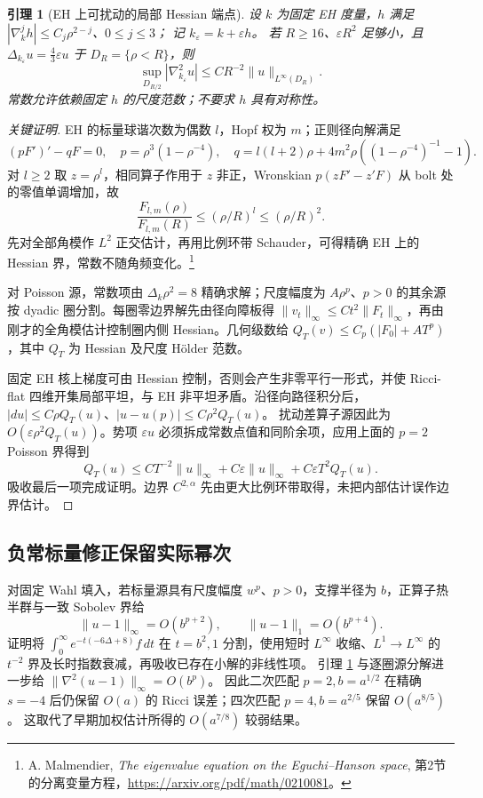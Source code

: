 \documentclass[UTF8,fontset=fandol,zihao=-4,oneside,openany]{ctexbook}
\theoremstyle{cjkplain}
\newtheorem{lemma}[theorem]{引理}
\numberwithin{equation}{chapter}
\begin{document}
\begin{lemma}[EH 上可扰动的局部 Hessian 端点]\label{FND:Hessian}
设 \(k\) 为固定 EH 度量，\(h\) 满足
\(|\nabla_k^jh|\le C_j\rho^{2-j}\)、\(0\le j\le3\)；
记 \(k_\varepsilon=k+\varepsilon h\)。
若 \(R\ge16\)、\(\varepsilon R^2\) 足够小，且
\(\Delta_{k_\varepsilon}u=\frac43\varepsilon u\) 于 \(D_R=\{\rho<R\}\)，则
\[
\sup_{D_{R/2}}|\nabla^2_{k_\varepsilon}u|
\le CR^{-2}\|u\|_{L^\infty(D_R)} .
\]
常数允许依赖固定 \(h\) 的尺度范数；不要求 \(h\) 具有对称性。
\end{lemma}
\begin{proof}[关键证明]
EH 的标量球谐次数为偶数 \(l\)，Hopf 权为 \(m\)；正则径向解满足
\[
(pF')'-qF=0,\quad
p=\rho^3(1-\rho^{-4}),\quad
q=l(l+2)\rho+4m^2\rho((1-\rho^{-4})^{-1}-1).
\]
对 \(l\ge2\) 取 \(z=\rho^l\)，相同算子作用于 \(z\) 非正，Wronskian
\(p(zF'-z'F)\) 从 bolt 处的零值单调增加，故
\[
\frac{F_{l,m}(\rho)}{F_{l,m}(R)}
\le(\rho/R)^l\le(\rho/R)^2 .
\]
先对全部角模作 \(L^2\) 正交估计，再用比例环带 Schauder，可得精确 EH 上的 Hessian 界，常数不随角频变化。\footnote{A. Malmendier, \emph{The eigenvalue equation on the Eguchi--Hanson space}, 第2节的分离变量方程，\url{https://arxiv.org/pdf/math/0210081}。}

对 Poisson 源，常数项由 \(\Delta_k\rho^2=8\) 精确求解；尺度幅度为 \(A\rho^p\)、\(p>0\) 的其余源按 dyadic 圈分割。每圈零边界解先由径向障板得
\(\|v_t\|_\infty\le Ct^2\|F_t\|_\infty\)，再由刚才的全角模估计控制圈内侧 Hessian。几何级数给
\(Q_T(v)\le C_p(|F_0|+AT^p)\)，其中 \(Q_T\) 为 Hessian 及尺度 Hölder 范数。

固定 EH 核上梯度可由 Hessian 控制，否则会产生非零平行一形式，并使 Ricci-flat 四维开集局部平坦，与 EH 非平坦矛盾。沿径向路径积分后，
\(|du|\le C\rho Q_T(u)\)、\(|u-u(p)|\le C\rho^2Q_T(u)\)。
扰动差算子源因此为 \(O(\varepsilon\rho^2Q_T(u))\)。势项
\(\varepsilon u\) 必须拆成常数点值和同阶余项，应用上面的 \(p=2\) Poisson 界得到
\[
Q_T(u)\le CT^{-2}\|u\|_\infty+
C\varepsilon\|u\|_\infty+
C\varepsilon T^2Q_T(u).
\]
吸收最后一项完成证明。边界 \(C^{2,\alpha}\) 先由更大比例环带取得，未把内部估计误作边界估计。
\end{proof}

\subsection{负常标量修正保留实际幂次}
对固定 Wahl 填入，若标量源具有尺度幅度 \(w^p\)、\(p>0\)，支撑半径为 \(b\)，正算子热半群与一致 Sobolev 界给
\[
\|u-1\|_\infty=O(b^{p+2}),\qquad
\|u-1\|_1=O(b^{p+4}).
\]
证明将 \(\int_0^\infty e^{-t(-6\Delta+8)}f\,dt\) 在 \(t=b^2,1\) 分割，使用短时 \(L^\infty\) 收缩、\(L^1\to L^\infty\) 的 \(t^{-2}\) 界及长时指数衰减，再吸收已存在小解的非线性项。
引理 \ref{FND:Hessian} 与逐圈源分解进一步给
\(\|\nabla^2(u-1)\|_\infty=O(b^p)\)。
因此二次匹配 \(p=2,b=a^{1/2}\) 在精确 \(s=-4\) 后仍保留 \(O(a)\) 的 Ricci 误差；四次匹配 \(p=4,b=a^{2/5}\) 保留 \(O(a^{8/5})\)。
这取代了早期加权估计所得的 \(O(a^{7/8})\) 较弱结果。
\end{document}
